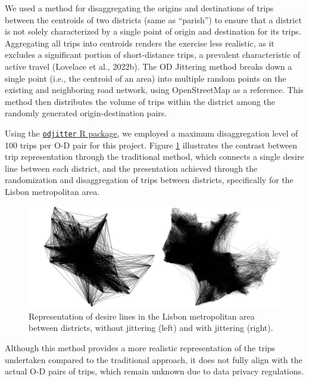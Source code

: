 \documentclass[review, doubleblind, 3p,
authoryear]{elsarticle} %
\begin{document}
We used a method for disaggregating the origins and destinations of
trips between the centroids of two districts (same as ``parish'') to
ensure that a district is not solely characterized by a single point of
origin and destination for its trips. Aggregating all trips into
centroids renders the exercise less realistic, as it excludes a
significant portion of short-distance trips, a prevalent characteristic
of active travel (Lovelace et al., 2022b). The OD Jittering method
breaks down a single point (i.e., the centroid of an area) into multiple
random points on the existing and neighboring road network, using
OpenStreetMap as a reference. This method then distributes the volume of
trips within the district among the randomly generated
origin-destination pairs.

Using the
\href{https://github.com/dabreegster/odjitter}{\texttt{odjitter} R
package}, we employed a maximum disaggregation level of 100 trips per
O-D pair for this project. Figure \ref{fig:jitter} illustrates the
contrast between trip representation through the traditional method,
which connects a single desire line between each district, and the
presentation achieved through the randomization and disaggregation of
trips between districts, specifically for the Lisbon metropolitan area.

\begin{figure}

{\centering \includegraphics[width=1\linewidth,]{img/jitter} 

}

\caption{Representation of desire lines in the Lisbon metropolitan area between districts, without jittering (left) and with jittering (right).}\label{fig:jitter}
\end{figure}

Although this method provides a more realistic representation of the
trips undertaken compared to the traditional approach, it does not fully
align with the actual O-D pairs of trips, which remain unknown due to
data privacy regulations.
\end{document}
